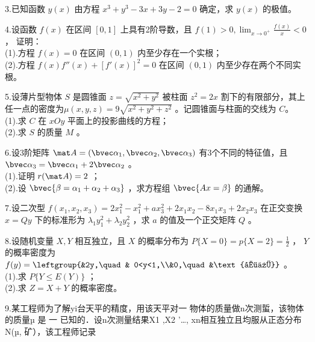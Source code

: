 3.已知函数 $y(x)$ 由方程 $x^3+y^3-3x+3y-2=0$  确定，求 $y(x)$ 的极值。

4.设函数  $f(x)$ 在区间 $[0,1]$  上具有2阶导数，且 $\displaystyle f(1)>0,\lim_{x \to 0^+}\frac{f(x)}{x}<0$ ，  证明：\\
(1).方程 $f(x)=0$  在区间 $(0,1)$ 内至少存在一个实根；\\
(2).方程 $f(x)f''(x)+[f'(x)]^2=0$ 在区间 $(0,1)$ 内至少存在两个不同实根。

5.设薄片型物体 $S$ 是圆锥面  $z=\sqrt{x^2+y^2}$ 被柱面 $z^2=2x$  割下的有限部分，其上任一点的密度为$\mu(x,y,z)=9\sqrt{x^2+y^2+z^2}$   。记圆锥面与柱面的交线为 $C$。\\
(1).求 $C$ 在 $xOy$  平面上的投影曲线的方程；\\
(2).求 $S$ 的质量 $M$ 。

6.设3阶矩阵 $\mat A=(\bvec \alpha_1,\bvec \alpha_2,\bvec \alpha_3)$  有3个不同的特征值，且 $\bvec \alpha_3=\bvec \alpha_1+2\bvec \alpha_2$ 。\\
(1).证明 $r(\mat A)=2$ ；\\
(2).设 $\bvec{\beta=\alpha_1+\alpha_2+\alpha_3}$  ，求方程组 $\bvec{Ax=\beta}$  的通解。

7.设二次型  $f(x_1,x_2,x_3)=2x_1^2-x_1^2+ax_3^2+2x_1x_2-8x_1x_3+2x_2x_3$ 在正交变换  $x=Qy$ 下的标准形为 $\lambda_1y_1^2+\lambda_2y_2^2$  ，求 $a$ 的值及一个正交矩阵 $Q$ 。

8.设随机变量 $X,Y$  相互独立，且 $X$  的概率分布为 $P\{X=0\}=p\{X=2\}=\frac{1}{2}$  ， $Y$ 的概率密度为 $f(y)=\leftgroup{&2y,\quad & 0<y<1,\\&0,\quad &\text{其他}}$ 。\\
(1).求 $P\{Y \le E(Y)\}$ ；\\
(2).求 $Z=X+Y$ 的概率密度。

9.某工程师为了解yi台天平的精度，用该天平对一 物体的质量做n次测蜇，该物体的质量µ  是
一
已知的．设n次测量结果X1 ,X2 '…, xn相互独立且均服从正态分布N(µ, 矿），该工程师记录